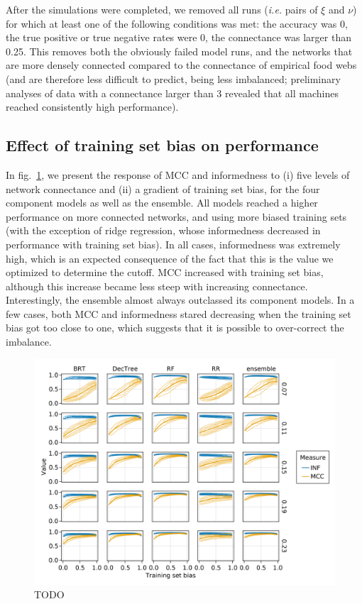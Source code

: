 \documentclass[11pt]{article}
\makeatletter
\def\maxwidth{\ifdim\Gin@nat@width>\linewidth\linewidth
\else\Gin@nat@width\fi}
\let\Oldincludegraphics\includegraphics
\renewcommand{\includegraphics}[1]{\Oldincludegraphics[width=\maxwidth]{#1}}
\makeatother
\begin{document}
After the simulations were completed, we removed all runs (\emph{i.e.}
pairs of \(\xi\) and \(\nu\)) for which at least one of the following
conditions was met: the accuracy was 0, the true positive or true
negative rates were 0, the connectance was larger than 0.25. This
removes both the obviously failed model runs, and the networks that are
more densely connected compared to the connectance of empirical food
webs (and are therefore less difficult to predict, being less
imbalanced; preliminary analyses of data with a connectance larger than
3 revealed that all machines reached consistently high performance).

\hypertarget{effect-of-training-set-bias-on-performance}{%
\subsection{Effect of training set bias on
performance}\label{effect-of-training-set-bias-on-performance}}

In fig.~\ref{fig:biasmccinf}, we present the response of MCC and
informedness to (i) five levels of network connectance and (ii) a
gradient of training set bias, for the four component models as well as
the ensemble. All models reached a higher performance on more connected
networks, and using more biased training sets (with the exception of
ridge regression, whose informedness decreased in performance with
training set bias). In all cases, informedness was extremely high, which
is an expected consequence of the fact that this is the value we
optimized to determine the cutoff. MCC increased with training set bias,
although this increase became less steep with increasing connectance.
Interestingly, the ensemble almost always outclassed its component
models. In a few cases, both MCC and informedness stared decreasing when
the training set bias got too close to one, which suggests that it is
possible to over-correct the imbalance.

\begin{figure}
\hypertarget{fig:biasmccinf}{%
\centering
\includegraphics{figures/bias_mcc_inf.png}
\caption{TODO}\label{fig:biasmccinf}
}
\end{figure}
\end{document}
